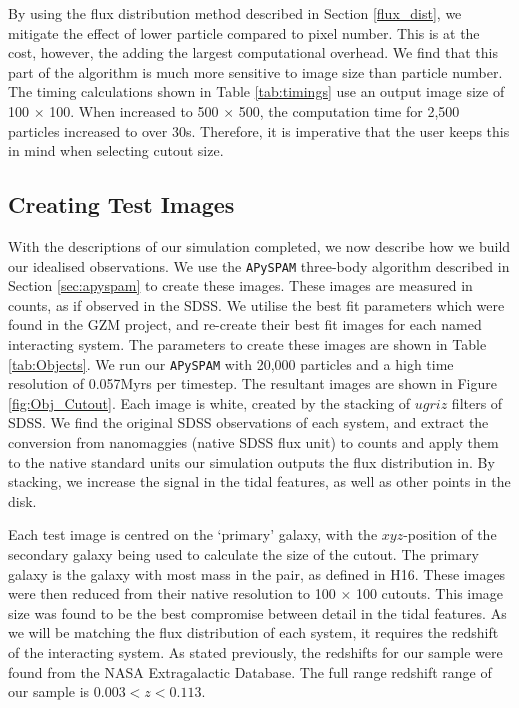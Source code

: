 By using the flux distribution method described in Section \ref{flux_dist}, we mitigate the effect of lower particle compared to pixel number. This is at the cost, however, the adding the largest computational overhead. We find that this part of the algorithm is much more sensitive to image size than particle number. The timing calculations shown in Table \ref{tab:timings} use an output image size of 100 $\times$ 100. When increased to 500 $\times$ 500, the computation time for 2,500 particles increased to over 30s. Therefore, it is imperative that the user keeps this in mind when selecting cutout size.

\subsection{Creating Test Images}\label{sec:syn_sample}
With the descriptions of our simulation completed, we now describe how we build our idealised observations. We use the \texttt{APySPAM} three-body algorithm described in Section \ref{sec:apyspam} to create these images. These images are measured in counts, as if observed in the SDSS. We utilise the best fit parameters which were found in the GZM project, and re-create their best fit images for each named interacting system. The parameters to create these images are shown in Table \ref{tab:Objects}. We run our \texttt{APySPAM} with 20,000 particles and a high time resolution of 0.057Myrs per timestep. The resultant images are shown in Figure \ref{fig:Obj_Cutout}. Each image is white, created by the stacking of $ugriz$ filters of SDSS. We find the original SDSS observations of each system, and extract the conversion from nanomaggies (native SDSS flux unit) to counts and apply them to the native standard units our simulation outputs the flux distribution in. By stacking, we increase the signal in the tidal features, as well as other points in the disk. 

Each test image is centred on the `primary' galaxy, with the $xyz$-position of the secondary galaxy being used to calculate the size of the cutout. The primary galaxy is the galaxy with most mass in the pair, as defined in H16. These images were then reduced from their native resolution to 100 $\times$ 100 cutouts. This image size was found to be the best compromise between detail in the tidal features. As we will be matching the flux distribution of each system, it requires the redshift of the interacting system. As stated previously, the redshifts for our sample were found from the NASA Extragalactic Database. The full range redshift range of our sample is $0.003 < z < 0.113$.


